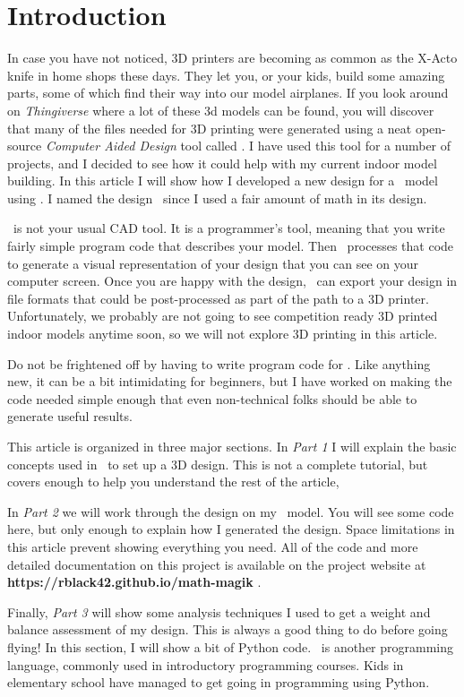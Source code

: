 \section{Introduction}

In case you have not noticed, 3D printers are becoming as common as the X-Acto
knife in home shops these days. They let you, or your kids, build some amazing
parts, some of which find their way into our model airplanes. If you look
around on {\it Thingiverse} \cite{thingy} where a lot of these 3d models can be
found, you will discover that many of the files needed for 3D printing were
generated using a neat open-source {\it Computer Aided Design} tool called \osc.
I have used this tool for a number of projects, and I decided to see how it
could help with my current indoor model building. In this article I will show
how I developed a new design for a \LPP\ model using \osc. I named the design
\MM\ since I used a fair amount of math in its design.

\osc\ is not your usual CAD tool. It is a programmer's tool, meaning that you
write fairly simple program code that describes your model. Then \osc\ processes
that code to generate a visual representation of your design that you can see on
your computer screen. Once you are happy with the design, \osc\ can export your
design in file formats that could be post-processed as part of the path to a 3D
printer. Unfortunately, we probably are not going to see competition ready 3D
printed indoor models anytime soon, so we will not explore 3D printing in this
article.

Do not be frightened off by having to write program code for \osc. Like
anything new, it can be a bit intimidating for beginners, but I have worked on
making the code needed simple enough that even non-technical folks should be
able to generate useful results.

This article is organized in three major sections. In {\it Part 1} I will
explain the basic concepts used in \osc\ to set up a 3D design. This is not a
complete tutorial, but covers enough to help you understand the rest of the
article,

In {\it Part 2} we will work through the design on my \LPP\ model. You will see
some code here, but only enough to explain how I generated the design. Space
limitations in this article prevent showing everything you need. All of the
code and more detailed documentation on this project is available on the
project website at {\bf https://rblack42.github.io/math-magik} \cite{mmagik}.

Finally, {\it Part 3} will show some analysis techniques I used to get a weight
and balance assessment of my design.  This is always a good thing to do before
going flying! In this section, I will show a bit of Python code. \PY\ is
another programming language, commonly used in introductory programming
courses. Kids in elementary school have managed to get going in programming
using Python.







